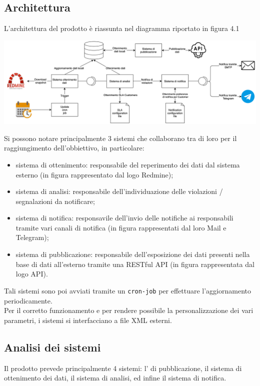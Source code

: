     \subsection{Architettura}
        L'architettura del prodotto è riassunta nel diagramma riportato in figura 4.1
        \begin{center}
            \includegraphics[keepaspectratio = true, width=15cm]{immagini/progettazione/architettura.png}
        \end{center}
    	Si possono notare principalmente 3 sistemi che collaborano tra di loro per il raggiungimento dell'obbiettivo, in particolare:
    	\begin{itemize}
    		\item sistema di ottenimento: responsabile del reperimento dei dati dal sistema esterno (in figura rappresentato dal logo Redmine);
    		\item sistema di analisi: responsabile dell'individuazione delle violazioni / segnalazioni da notificare;
    		\item sistema di notifica: responsavile dell'invio delle notifiche ai responsabili  tramite vari canali di notifica (in figura rappresentati dal loro Mail e Telegram);
    		\item sistema di pubblicazione: responsabile dell'esposizione dei dati presenti nella base di dati all'esterno tramite una RESTful API (in figura rappresentata dal logo API).
    	\end{itemize}
    	Tali sistemi sono poi avviati tramite un \texttt{cron-job} per effettuare l'aggiornamento periodicamente.\\
    	Per il corretto funzionamento e per rendere possibile la personalizzazione dei vari parametri, i sistemi si interfacciano a file XML esterni.
        \subsection{Analisi dei sistemi}
            Il prodotto prevede principalmente 4 sistemi: l' di pubblicazione, il sistema di ottenimento dei dati, il sistema di analisi, ed infine il sistema di notifica.
